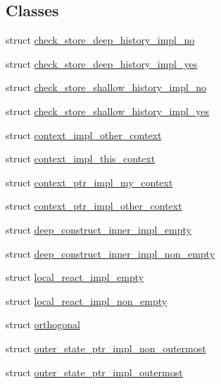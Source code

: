 \subsection*{Classes}
\begin{DoxyCompactItemize}
\item 
struct \mbox{\hyperlink{structboost_1_1statechart_1_1simple__state_1_1check__store__deep__history__impl__no}{check\+\_\+store\+\_\+deep\+\_\+history\+\_\+impl\+\_\+no}}
\item 
struct \mbox{\hyperlink{structboost_1_1statechart_1_1simple__state_1_1check__store__deep__history__impl__yes}{check\+\_\+store\+\_\+deep\+\_\+history\+\_\+impl\+\_\+yes}}
\item 
struct \mbox{\hyperlink{structboost_1_1statechart_1_1simple__state_1_1check__store__shallow__history__impl__no}{check\+\_\+store\+\_\+shallow\+\_\+history\+\_\+impl\+\_\+no}}
\item 
struct \mbox{\hyperlink{structboost_1_1statechart_1_1simple__state_1_1check__store__shallow__history__impl__yes}{check\+\_\+store\+\_\+shallow\+\_\+history\+\_\+impl\+\_\+yes}}
\item 
struct \mbox{\hyperlink{structboost_1_1statechart_1_1simple__state_1_1context__impl__other__context}{context\+\_\+impl\+\_\+other\+\_\+context}}
\item 
struct \mbox{\hyperlink{structboost_1_1statechart_1_1simple__state_1_1context__impl__this__context}{context\+\_\+impl\+\_\+this\+\_\+context}}
\item 
struct \mbox{\hyperlink{structboost_1_1statechart_1_1simple__state_1_1context__ptr__impl__my__context}{context\+\_\+ptr\+\_\+impl\+\_\+my\+\_\+context}}
\item 
struct \mbox{\hyperlink{structboost_1_1statechart_1_1simple__state_1_1context__ptr__impl__other__context}{context\+\_\+ptr\+\_\+impl\+\_\+other\+\_\+context}}
\item 
struct \mbox{\hyperlink{structboost_1_1statechart_1_1simple__state_1_1deep__construct__inner__impl__empty}{deep\+\_\+construct\+\_\+inner\+\_\+impl\+\_\+empty}}
\item 
struct \mbox{\hyperlink{structboost_1_1statechart_1_1simple__state_1_1deep__construct__inner__impl__non__empty}{deep\+\_\+construct\+\_\+inner\+\_\+impl\+\_\+non\+\_\+empty}}
\item 
struct \mbox{\hyperlink{structboost_1_1statechart_1_1simple__state_1_1local__react__impl__empty}{local\+\_\+react\+\_\+impl\+\_\+empty}}
\item 
struct \mbox{\hyperlink{structboost_1_1statechart_1_1simple__state_1_1local__react__impl__non__empty}{local\+\_\+react\+\_\+impl\+\_\+non\+\_\+empty}}
\item 
struct \mbox{\hyperlink{structboost_1_1statechart_1_1simple__state_1_1orthogonal}{orthogonal}}
\item 
struct \mbox{\hyperlink{structboost_1_1statechart_1_1simple__state_1_1outer__state__ptr__impl__non__outermost}{outer\+\_\+state\+\_\+ptr\+\_\+impl\+\_\+non\+\_\+outermost}}
\item 
struct \mbox{\hyperlink{structboost_1_1statechart_1_1simple__state_1_1outer__state__ptr__impl__outermost}{outer\+\_\+state\+\_\+ptr\+\_\+impl\+\_\+outermost}}
\end{DoxyCompactItemize}
